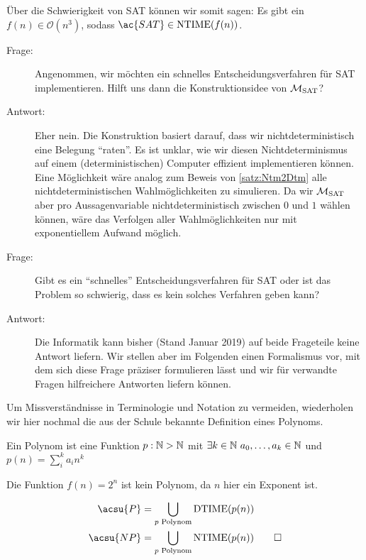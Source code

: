 Über die Schwierigkeit von \ac{SAT} können wir somit sagen:
Es gibt ein $f(n)\in\mathcal{O}(n^3)$, sodass $\ac{SAT}\in\NTIME(f(n))$.



\begin{description}
 \item[Frage:] Angenommen, wir möchten ein schnelles Entscheidungsverfahren für \ac{SAT} implementieren.
Hilft uns dann die Konstruktionsidee von $\mathcal{M}_\text{SAT}$?
 \item[Antwort:] Eher nein. 
Die Konstruktion basiert darauf, dass wir nichtdeterministisch eine Belegung "`raten"'.
Es ist unklar, wie wir diesen Nichtdeterminismus auf einem (deterministischen) Computer effizient implementieren können.
Eine Möglichkeit wäre analog zum Beweis von \autoref{satz:Ntm2Dtm} alle nichtdeterministischen Wahlmöglichkeiten zu simulieren.
Da wir $\mathcal{M}_\text{SAT}$ aber pro Aussagenvariable nichtdeterministisch zwischen $0$ und $1$ wählen können, wäre das Verfolgen aller Wahlmöglichkeiten nur mit exponentiellem Aufwand möglich.
\end{description}

\begin{description}
 \item[Frage:] Gibt es ein "`schnelles"' Entscheidungsverfahren für \ac{SAT} oder ist das Problem so schwierig, dass es kein solches Verfahren geben kann?
 \item[Antwort:] Die Informatik kann bisher (Stand Januar 2019) auf beide Frageteile keine Antwort liefern. 
 Wir stellen aber im Folgenden einen Formalismus vor, mit dem sich diese Frage präziser formulieren lässt und wir für verwandte Fragen hilfreichere Antworten liefern können.
\end{description}


Um Missverständnisse in Terminologie und Notation zu vermeiden, wiederholen wir hier nochmal die aus der Schule bekannte Definition eines Polynoms.

\begin{Def}[name={[Polynom]}]
	Ein Polynom ist eine Funktion $p:\mathbb{N}\->\mathbb{N}$ mit $\exists k\in \mathbb{N}\ a_0,\dots,a_k\in\mathbb{N}$ und \mbox{$p(n)=\sum_i^k a_in^k$}
\end{Def}
\begin{Bemerkung}
 Die Funktion $f(n)=2^n$ ist kein Polynom, da $n$ hier ein Exponent ist.
\end{Bemerkung}

\begin{Def}
 \begin{align*}
  \acsu{P} &= \bigcup_{p\text{ Polynom}} \DTIME(p(n)) \\
  \acsu{NP} &= \bigcup_{p\text{ Polynom}} \NTIME(p(n))
  \qedhere
 \end{align*}
\end{Def}

